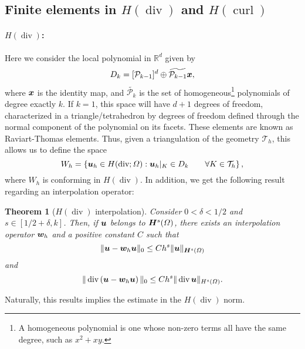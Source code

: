 \documentclass{article}
\renewcommand{\vec}{\vectorsym}
\DeclareMathOperator{\dive}{\text{div}}
\DeclareMathOperator{\curl}{\text{curl}}
\newcommand{\R}{\mathbb{R}}
\newcommand{\T}{\mathcal{T}}
\renewcommand{\P}{\mathcal{P}}
\newtheorem{theorem}{Theorem}
\begin{document}
\subsection{Finite elements in $H(\dive)$ and $H(\curl)$}
\paragraph{$H(\dive)$:} Here we consider the local polynomial in $\R^d$ given by
    $$ D_k = [\P_{k-1}]^d \oplus \widetilde{\P_{k-1}} \vec x, $$
where $\vec x$ is the identity map, and $\widetilde{\P_k}$ is the set of homogeneous\footnote{A homogeneous polynomial is one whose non-zero terms all have the same degree, such as $x^2 + xy$.} polynomials of degree exactly $k$. If $k=1$, this space will have $d+1$ degrees of freedom, characterized in a triangle/tetrahedron by degrees of freedom defined through the normal component of the polynomial on its facets. These elements are known as Raviart-Thomas elements. Thus, given a triangulation of the geometry $\T_h$, this allows us to define the space
    $$ W_h = \left\{ \vec u_h \in H(\dive; \Omega):  \vec u_h|_K \in D_k \qquad\forall K \in \T_h \right\}, $$
where $W_h$ is conforming in $H(\dive)$. In addition, we get the following result regarding an interpolation operator: 
    \begin{theorem}[$H(\dive)$ interpolation]
        Consider $0<\delta<1/2$ and $s\in [1/2+\delta, k]$. Then, if $\vec u$ belongs to $\vec H^s(\Omega)$, there exists an interpolation operator $\vec w_h$ and a positive constant $C$ such that
            $$ \|\vec u - \vec w_h \vec u\|_0 \leq C h^s \| \vec u \|_{\vec H^s(\Omega)} $$
        and 
            $$ \|\dive\left(\vec u - \vec w_h \vec u\right)\|_0 \leq C h^s \| \dive \vec u \|_{H^s(\Omega)}. $$
    \end{theorem}
Naturally, this results implies the estimate in the $H(\dive)$ norm. 
\end{document}

